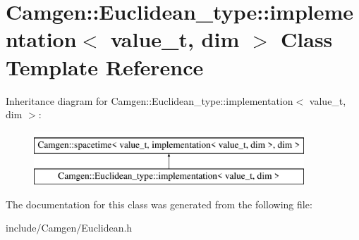\hypertarget{a00295}{\section{Camgen\-:\-:Euclidean\-\_\-type\-:\-:implementation$<$ value\-\_\-t, dim $>$ Class Template Reference}
\label{a00295}
}
Inheritance diagram for Camgen\-:\-:Euclidean\-\_\-type\-:\-:implementation$<$ value\-\_\-t, dim $>$\-:\begin{figure}[H]
\begin{center}
\leavevmode
\includegraphics[height=2.000000cm]{a00295}
\end{center}
\end{figure}


The documentation for this class was generated from the following file\-:\begin{DoxyCompactItemize}
\item 
include/\-Camgen/Euclidean.\-h\end{DoxyCompactItemize}
